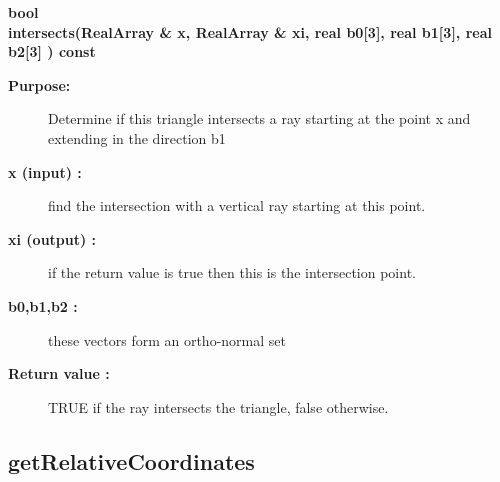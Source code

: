 \begin{flushleft} \textbf{%
bool  \\ 
\settowidth{\TriangleIncludeArgIndent}{intersects(}%
intersects(RealArray \& x, RealArray \&  xi, real b0[3], real b1[3], real b2[3]  ) const
}\end{flushleft}
\begin{description}
\item[{\bf Purpose:}]  
   Determine if this triangle intersects a ray starting at the point x and
     extending in the direction b1
\item[{\bf x (input) :}]  find the intersection with a vertical ray starting at this point.
\item[{\bf xi (output) :}]  if the return value is true then this is the intersection point.
\item[{\bf b0,b1,b2 :}]  these vectors form an ortho-normal set
\item[{\bf Return value :}]  TRUE if the ray intersects the triangle, false otherwise.
\end{description}
\subsection{getRelativeCoordinates}
 
